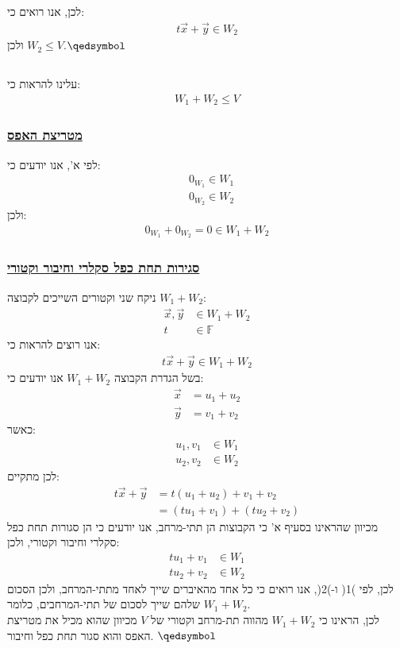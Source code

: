 \documentclass[a4paper, 12pt, leqno]{article}
\newcommand{\sub}[1]{\subsection{\underline{#1}}}
\newcommand{\subsub}[1]{\subsubsection{\underline{#1}}}
\newcommand{\F}{\ensuremath{\mathbb{F}}}
\newcommand{\eq}[1]{\begin{align*}#1\end{align*}}
\newcommand{\eqn}[1]{\begin{align}#1\end{align}}
\renewcommand{\qed}{\hfill\(\qedsymbol\)}
\renewcommand{\leq}{\leqslant}
\begin{document}
לכן, אנו רואים כי:
\eq{
    t\vec{x}+\vec{y}\in{W_2}
}
ולכן $W_2\leq{V}$.\qed
\sub{}
עלינו להראות כי:
\eq{
    W_1+W_2\leq{V}
}
\subsub{מטריצת האפס}
לפי א', אנו יודעים כי:
\eq{
    &0_{W_1}\in{W_1}\\
    &0_{W_2}\in{W_2}
}
ולכן:
\eq{
    0_{W_1}+0_{W_2}=0\in{W_1+W_2}
}
\subsub{סגירות תחת כפל סקלרי וחיבור וקטורי}
ניקח שני וקטורים השייכים לקבוצה $W_1+W_2$:
\eq{
    \vec{x},\vec{y}&\in{W_1+W_2}\\
    t&\in\F
}
אנו רוצים להראות כי:
\eq{
    t\vec{x}+\vec{y}\in{W_1+W_2}
}
בשל הגדרת הקבוצה $W_1+W_2$ אנו יודעים כי:
\eq{
    \vec{x}&=u_1+u_2\\
    \vec{y}&=v_1+v_2
}
כאשר:
\eq{
    u_1,v_1&\in{W_1}\\
    u_2,v_2&\in{W_2}
}
לכן מתקיים:
\eqn{
    t\vec{x}+\vec{y}&=t(u_1+u_2)+v_1+v_2\\
    &=(tu_1+v_1)+(tu_2+v_2)\nonumber
}
מכיוון שהראינו בסעיף א' כי הקבוצות הן תתי-מרחב, אנו יודעים כי הן סגורות תחת כפל סקלרי וחיבור וקטורי, ולכן:
\eqn{
    tu_1+v_1&\in{W_1}\\
    tu_2+v_2&\in{W_2}\nonumber
}
לכן, לפי )1( ו-)2(, אנו רואים כי כל אחד מהאיברים שייך לאחד מתתי-המרחב, ולכן הסכום שלהם שייך לסכום של תתי-המרחבים, כלומר $W_1+W_2$.\\
לכן, הראינו כי $W_1+W_2$ מהווה תת-מרחב וקטורי של $V$ מכיוון שהוא מכיל את מטריצת האפס והוא סגור תחת כפל וחיבור.
\qed
\sub{}



\end{document}

